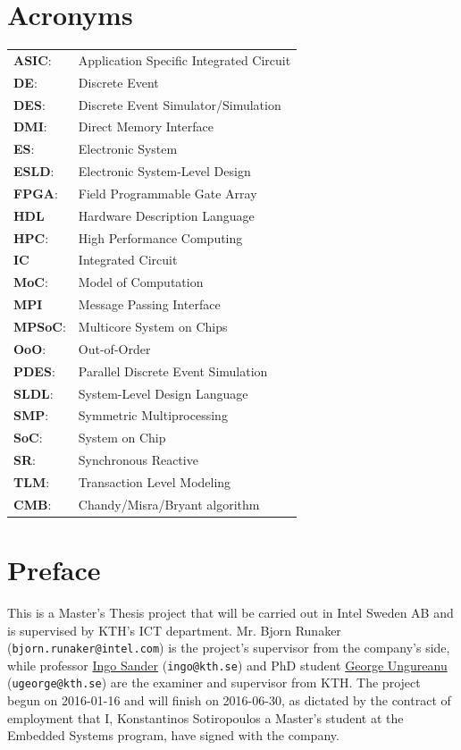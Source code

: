 \documentclass[12pt,twoside]{article}
\begin{document}
\section*{Acronyms}
\label{sec-1}
\begin{center}
\begin{tabular}{ll}
\textbf{ASIC}: & Application Specific Integrated Circuit\\
\textbf{DE}: & Discrete Event\\
\textbf{DES}: & Discrete Event Simulator/Simulation\\
\textbf{DMI}: & Direct Memory Interface\\
\textbf{ES}: & Electronic System\\
\textbf{ESLD}: & Electronic System-Level Design\\
\textbf{FPGA}: & Field Programmable Gate Array\\
\textbf{HDL} & Hardware Description Language\\
\textbf{HPC}: & High Performance Computing\\
\textbf{IC} & Integrated Circuit\\
\textbf{MoC}: & Model of Computation\\
\textbf{MPI} & Message Passing Interface\\
\textbf{MPSoC}: & Multicore System on Chips\\
\textbf{OoO}: & Out-of-Order\\
\textbf{PDES}: & Parallel Discrete Event Simulation\\
\textbf{SLDL}: & System-Level Design Language\\
\textbf{SMP}: & Symmetric Multiprocessing\\
\textbf{SoC}: & System on Chip\\
\textbf{SR}: & Synchronous Reactive\\
\textbf{TLM}: & Transaction Level Modeling\\
\textbf{CMB}: & Chandy/Misra/Bryant algorithm\\
\end{tabular}
\end{center}
\clearpage





\section*{Preface}
\label{sec-2}
This is a Master's Thesis project that will be carried out in Intel Sweden AB and is supervised by KTH's ICT department.
Mr. Bjorn Runaker (\texttt{bjorn.runaker@intel.com}) is the project's supervisor from the company's side, 
while professor \href{https://people.kth.se/~ingo/}{Ingo Sander} (\texttt{ingo@kth.se}) and PhD student \href{http://people.kth.se/~ugeorge/}{George Ungureanu} (\texttt{ugeorge@kth.se}) are the examiner and supervisor from KTH. 
The project begun on 2016-01-16 and will finish on 2016-06-30, as dictated by the contract of employment that I, Konstantinos Sotiropoulos a Master's student at the Embedded Systems program, have signed with the company.
\end{document}
